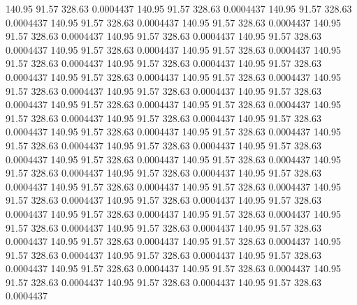  140.95   91.57  328.63   0.0004437
 140.95   91.57  328.63   0.0004437
 140.95   91.57  328.63   0.0004437
 140.95   91.57  328.63   0.0004437
 140.95   91.57  328.63   0.0004437
 140.95   91.57  328.63   0.0004437
 140.95   91.57  328.63   0.0004437
 140.95   91.57  328.63   0.0004437
 140.95   91.57  328.63   0.0004437
 140.95   91.57  328.63   0.0004437
 140.95   91.57  328.63   0.0004437
 140.95   91.57  328.63   0.0004437
 140.95   91.57  328.63   0.0004437
 140.95   91.57  328.63   0.0004437
 140.95   91.57  328.63   0.0004437
 140.95   91.57  328.63   0.0004437
 140.95   91.57  328.63   0.0004437
 140.95   91.57  328.63   0.0004437
 140.95   91.57  328.63   0.0004437
 140.95   91.57  328.63   0.0004437
 140.95   91.57  328.63   0.0004437
 140.95   91.57  328.63   0.0004437
 140.95   91.57  328.63   0.0004437
 140.95   91.57  328.63   0.0004437
 140.95   91.57  328.63   0.0004437
 140.95   91.57  328.63   0.0004437
 140.95   91.57  328.63   0.0004437
 140.95   91.57  328.63   0.0004437
 140.95   91.57  328.63   0.0004437
 140.95   91.57  328.63   0.0004437
 140.95   91.57  328.63   0.0004437
 140.95   91.57  328.63   0.0004437
 140.95   91.57  328.63   0.0004437
 140.95   91.57  328.63   0.0004437
 140.95   91.57  328.63   0.0004437
 140.95   91.57  328.63   0.0004437
 140.95   91.57  328.63   0.0004437
 140.95   91.57  328.63   0.0004437
 140.95   91.57  328.63   0.0004437
 140.95   91.57  328.63   0.0004437
 140.95   91.57  328.63   0.0004437
 140.95   91.57  328.63   0.0004437
 140.95   91.57  328.63   0.0004437
 140.95   91.57  328.63   0.0004437
 140.95   91.57  328.63   0.0004437
 140.95   91.57  328.63   0.0004437
 140.95   91.57  328.63   0.0004437
 140.95   91.57  328.63   0.0004437
 140.95   91.57  328.63   0.0004437
 140.95   91.57  328.63   0.0004437
 140.95   91.57  328.63   0.0004437
 140.95   91.57  328.63   0.0004437
 140.95   91.57  328.63   0.0004437
